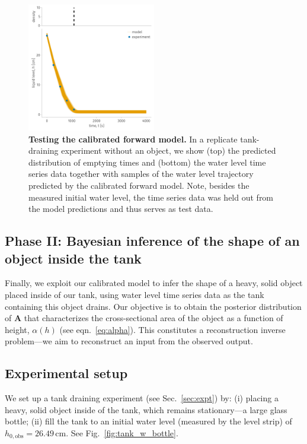 \documentclass[openacc]{rsproca_new}%
\begin{document}
\begin{figure}[h!]
    \centering
    	\includegraphics[width=0.5\textwidth]{../test.pdf}
    \caption{
      \textbf{Testing the calibrated forward model.}
      In a replicate tank-draining experiment without an object, we show (top) the predicted distribution of emptying times and (bottom) the water level time series data together with samples of the water level trajectory predicted by the calibrated forward model. Note, besides the measured initial water level, the time series data was held out from the model predictions and thus serves as test data.
      } \label{fig:test}
\end{figure}

\subsection{Phase II: Bayesian inference of the shape of an object inside the tank} \label{sec:phaseII}
Finally, we exploit our calibrated model to infer the shape of a heavy, solid object placed inside of our tank, using water level time series data as the tank containing this object drains.
Our objective is to obtain the posterior distribution of $\mathbf{A}$ that characterizes the cross-sectional area of the object as a function of height, $\alpha(h)$ (see eqn.~\ref{eq:alpha}).
This constitutes a reconstruction inverse problem---we aim to reconstruct an input from the observed output.

\subsection{Experimental setup}
We set up a tank draining experiment (see Sec.~\ref{sec:expt}) by:
(i) placing a heavy, solid object inside of the tank, which remains stationary---a large glass bottle;
(ii) fill the tank to an initial water level (measured by the level strip) of $h_{0, \text{obs}}=26.49$\,cm. 
See Fig.~\ref{fig:tank_w_bottle}.
\end{document}

